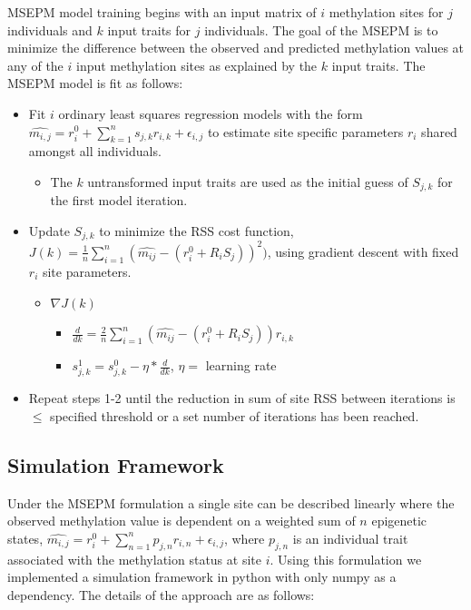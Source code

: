 \documentclass{article}
\begin{document}
{\begin{linenumbers}
MSEPM model training begins with an  input matrix of $i$ methylation sites for $j$ individuals 
and $k$ input traits for $j$ individuals. The goal of the MSEPM is to minimize the difference 
between the observed and predicted methylation values at any of the $i$ input methylation sites as 
explained by the $k$ input traits. The MSEPM model is fit as follows:
\begin{itemize}

    \item{Fit $i$ ordinary least squares regression models with the 
    form $\hat{m_{i,j}} = r^0_i + \sum^n_{k=1} s_{j,k} r_{i,k} + \epsilon_{i,j}$ to estimate site 
    specific parameters $r_i$ shared amongst all individuals. }
    \begin{itemize}
        \item{The $k$ untransformed input traits are used as the initial guess of $S_{j,k}$ 
        for the first model iteration. }
    \end{itemize}
    \item{Update $S_{j,k}$ to minimize the RSS cost 
    function, $J(k) = \frac{1}{n}\sum_{i=1}^n(\hat{m_{ij}} - (r^0_i + R_i S_j))^2)$, using 
    gradient descent with fixed $r_{i}$ site parameters.}
        \begin{itemize}
            \item{$\nabla J(k)$}
            \begin{itemize}
                \item{ $\frac{d}{dk} = \frac{2}{n} \sum_{i=1}^n (\hat{m_{ij}} - (r^0_i + R_i S_j)) r_{i,k}$}
                \item{$s^1_{j,k} = s^0_{j,k} - \eta * \frac{d}{dk}$, $\eta=$ learning rate}
            \end{itemize}
        \end{itemize}
    \item{Repeat steps 1-2 until the reduction in sum of site RSS between iterations is $\leq$ 
    specified threshold or a set number of iterations has been reached. }
\end{itemize}

\subsection{Simulation Framework}

Under the MSEPM formulation a single site can be described linearly where the observed methylation value is 
dependent on a weighted sum of $n$ epigenetic states, 
$\hat{m_{i,j}} = r^0_i + \sum^n_{n=1} p_{j,n} r_{i,n} + \epsilon_{i,j}$, where $p_{j,n}$ is an individual 
trait associated with the methylation status at site $i$. Using this formulation we implemented a simulation 
framework in python with only numpy \cite{Harris2020-yb} as a dependency.  The details of the approach are as follows:


\end{linenumbers}}
\end{document}

